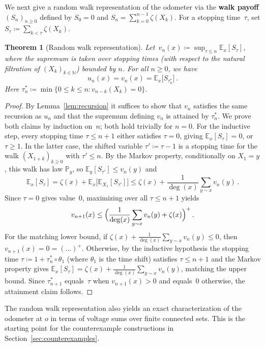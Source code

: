 \documentclass[11pt]{amsart}
\theoremstyle{plain}
\newtheorem{theorem}{Theorem}[section]
\theoremstyle{definition}
\newcommand{\N}{\mathbb{N}}
\newcommand{\E}{\mathbb{E}}
\renewcommand{\P}{\mathbb{P}}
\begin{document}
	We next give a random walk representation of the odometer via the \textbf{walk payoff} $(S_n)_{n\geq 0}$ defined by $S_0=0$ and $S_n=\sum_{k=0}^{n-1}\zeta(X_k)$.
	For a stopping time~$\tau$, set $S_\tau\coloneqq\sum_{k<\tau}\zeta(X_k)$.
	\begin{theorem}[Random walk representation]\label{thm:RW}
		Let~$v_n(x) \coloneqq \sup_{\tau \leq n} \E_x[S_\tau]$, where the supremum is taken over stopping times (with respect to the natural filtration of $(X_k)_{k\in\N}$) bounded by $n$.
		For all $n \geq 0$, we have
		\[
		u_n(x) = v_n(x) = \E_x\bigl[S_{\tau_n^*}\bigr]\,.
		\]
		Here $\tau_n^* \coloneqq \min\bigl\{0 \leq k \leq n : v_{n-k}(X_k) = 0\bigr\}$.
	\end{theorem}
	\begin{proof}
		By Lemma~\ref{lem:recursion} it suffices to show that $v_n$ satisfies the same recursion as $u_n$ and that the supremum defining $v_n$ is attained by $\tau_n^*$. We prove both claims by induction on~$n$; both hold trivially for $n = 0$.
		For the inductive step, every stopping time $\tau \leq n+1$ either satisfies $\tau = 0$, giving $\E_x[S_\tau] = 0$, or $\tau \geq 1$. In the latter case, the shifted variable $\tau' \coloneqq \tau - 1$ is a stopping time for the walk $(X_{1+k})_{k \geq 0}$ with $\tau' \leq n$. By the Markov property, conditionally on $X_1 = y$, this walk has law $\P_y$, so $\E_y[S_{\tau'}] \leq v_n(y)$ and
		\[
		\E_x[S_\tau] = \zeta(x) + \E_x\bigl[\E_{X_1}[S_{\tau'}]\bigr] \leq \zeta(x) + \frac{1}{\deg(x)}\sum_{y \sim x} v_n(y)\,.
		\]
		Since $\tau = 0$ gives value~$0$, maximizing over all $\tau \leq n+1$ yields
		\[
		v_{n+1}(x) \leq \Bigl(\frac{1}{\deg(x)}\sum_{y \sim x} v_n(y) + \zeta(x)\Bigr)^+\,.
		\]
		For the matching lower bound, if $\zeta(x) + \frac{1}{\deg(x)}\sum_{y \sim x} v_n(y) \leq 0$, then $v_{n+1}(x)=0=(\ldots)^+$. Otherwise, by the inductive hypothesis the stopping time $\tau\coloneqq 1+\tau_n^*\circ\theta_1$ (where $\theta_1$ is the time shift) satisfies $\tau\leq n+1$ and the Markov property gives $\E_x[S_\tau] = \zeta(x) + \frac{1}{\deg(x)}\sum_{y \sim x} v_n(y)$, matching the upper bound. Since $\tau_{n+1}^*$ equals~$\tau$ when $v_{n+1}(x)>0$ and equals~$0$ otherwise, the attainment claim follows.
	\end{proof}
	
	
	The random walk representation also yields an exact characterization of the odometer at $o$ in terms of voltage sums over finite connected sets. This is the starting point for the counterexample constructions in Section~\ref{sec:counterexamples}.
	
\end{document}

